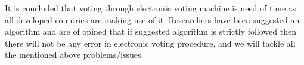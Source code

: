 \noindent It is concluded that voting through electronic voting machine is need of time as all developed countries are making use of it. Researchers have been suggested an algorithm and are of opined that if suggested algorithm is strictly followed then there will not be any error in electronic voting procedure, and we will tackle all the mentioned above problems/issues\cite{nikamcritical}.






%
%
